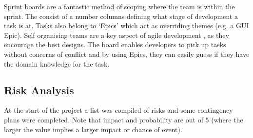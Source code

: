 Sprint boards are a fantastic method of scoping where the team is within the sprint. The consist of a number columns defining what stage of development a task is at. Tasks also belong to `Epics' which act as overriding themes (e.g. a GUI Epic). Self organising teams are a key aspect of agile development \citep{agile:manifesto}, as they encourage the best designs. The board enables developers to pick up tasks without concerns of conflict and by using Epics, they can easily guess if they have the domain knowledge for the task. 

\newpage
\subsection{Risk Analysis}
At the start of the project a list was compiled of risks and some contingency plans were completed. Note that impact and probability are out of 5 (where the larger the value implies a larger impact or chance of event). 



